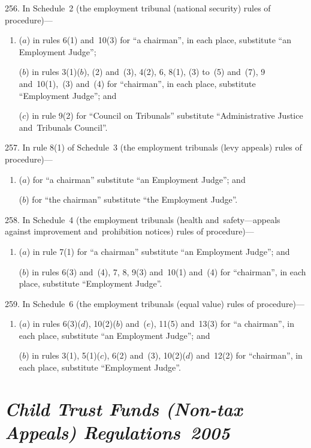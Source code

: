 \documentclass[12pt,a4paper]{article}
\begin{document}
\medskip

256.  In Schedule~2 (the employment tribunal (national security) rules of procedure)—
\begin{enumerate}\item[]
($a$) in rules 6(1) and~10(3) for “a chairman”, in each place, substitute “an Employment Judge”;

($b$) in rules 3(1)($b$), (2) and~(3), 4(2), 6, 8(1), (3) to~(5) and~(7), 9 and~10(1),~(3) and~(4) for “chairman”, in each place, substitute “Employment Judge”; and

($c$) in rule 9(2) for “Council on Tribunals” substitute “Administrative Justice and~Tribunals Council”.
\end{enumerate}

\medskip

257.  In rule 8(1) of Schedule~3 (the employment tribunals (levy appeals) rules of procedure)—
\begin{enumerate}\item[]
($a$) for “a chairman” substitute “an Employment Judge”; and

($b$) for “the chairman” substitute “the Employment Judge”.
\end{enumerate}

\medskip

258.  In Schedule~4 (the employment tribunals (health and~safety---appeals against improvement and~prohibition notices) rules of procedure)—
\begin{enumerate}\item[]
($a$) in rule 7(1) for “a chairman” substitute “an Employment Judge”; and

($b$) in rules 6(3) and~(4), 7, 8, 9(3) and~10(1) and~(4) for “chairman”, in each place, substitute “Employment Judge”.
\end{enumerate}

\medskip

259.  In Schedule~6 (the employment tribunals (equal value) rules of procedure)—
\begin{enumerate}\item[]
($a$) in rules 6(3)($d$), 10(2)($b$)  and~($e$), 11(5) and~13(3) for “a chairman”, in each place, substitute “an Employment Judge”; and

($b$) in rules 3(1), 5(1)($c$), 6(2) and~(3), 10(2)($d$)  and~12(2) for “chairman”, in each place, substitute “Employment Judge”.
\end{enumerate}

\section*{\itshape Child Trust Funds (Non-tax Appeals) Regulations~2005}
\end{document}
